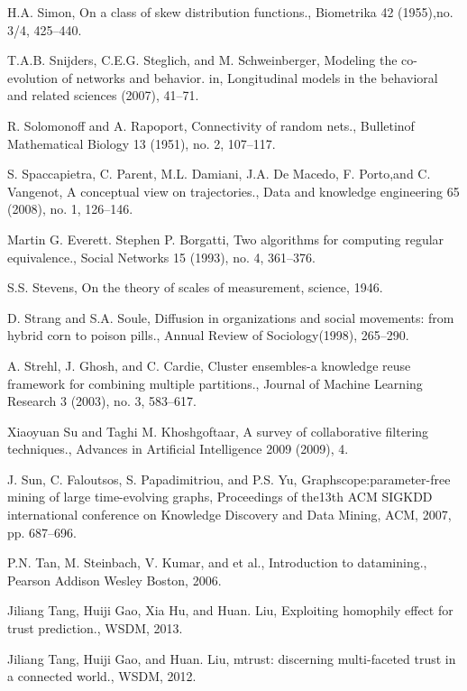 \begin{thebibliography}{999}
 H.A. Simon, On a class of skew distribution functions., Biometrika 42 (1955),no. 3/4, 425–440.

 T.A.B. Snijders, C.E.G. Steglich, and M. Schweinberger, Modeling the co-evolution of networks and behavior. in, Longitudinal models in the behavioral and related sciences (2007), 41–71.

 R. Solomonoff and A. Rapoport, Connectivity of random nets., Bulletinof Mathematical Biology 13 (1951), no. 2, 107–117.

 S. Spaccapietra, C. Parent, M.L. Damiani, J.A. De Macedo, F. Porto,and C. Vangenot, A conceptual view on trajectories., Data and knowledge engineering 65 (2008), no. 1, 126–146.

 Martin G. Everett. Stephen P. Borgatti, Two algorithms for computing regular equivalence., Social Networks 15 (1993), no. 4, 361–376.

 S.S. Stevens, On the theory of scales of measurement, science, 1946.

 D. Strang and S.A. Soule, Diffusion in organizations and social movements: from hybrid corn to poison pills., Annual Review of Sociology(1998), 265–290.

 A. Strehl, J. Ghosh, and C. Cardie, Cluster ensembles-a knowledge reuse framework for combining multiple partitions., Journal of Machine Learning Research 3 (2003), no. 3, 583–617.

 Xiaoyuan Su and Taghi M. Khoshgoftaar, A survey of collaborative filtering techniques., Advances in Artificial Intelligence 2009 (2009), 4.

 J. Sun, C. Faloutsos, S. Papadimitriou, and P.S. Yu, Graphscope:parameter-free mining of large time-evolving graphs, Proceedings of the13th ACM SIGKDD international conference on Knowledge Discovery and Data Mining, ACM, 2007, pp. 687–696.

 P.N. Tan, M. Steinbach, V. Kumar, and et al., Introduction to datamining., Pearson Addison Wesley Boston, 2006.

 Jiliang Tang, Huiji Gao, Xia Hu, and Huan. Liu, Exploiting homophily effect for trust prediction., WSDM, 2013.

 Jiliang Tang, Huiji Gao, and Huan. Liu, mtrust: discerning multi-faceted trust in a connected world., WSDM, 2012.


\end{thebibliography}
